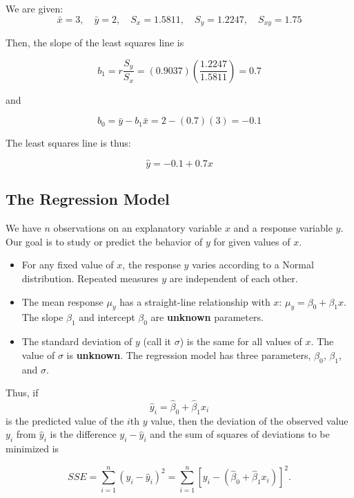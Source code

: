 \begin{example}
\vspace{1em}

We are given:
\[
\bar{x} = 3, \quad \bar{y} = 2, \quad S_x = 1.5811, \quad S_y = 1.2247, \quad S_{xy} = 1.75
\]

Then, the slope of the least squares line is

\[
b_1 = r \frac{S_y}{S_x} = (0.9037) \left( \frac{1.2247}{1.5811} \right) = 0.7
\]

and

\[
b_0 = \bar{y} - b_1 \bar{x} = 2 - (0.7)(3) = -0.1
\]

The least squares line is thus:

\[
\hat{y} = -0.1 + 0.7x
\]
\end{example}

\subsection*{The Regression Model}

We have $n$ observations on an explanatory variable $x$ and a response variable $y$. Our goal is to study or predict the behavior of $y$ for given values of $x$.

\begin{itemize}
  \item For any fixed value of $x$, the response $y$ varies according to a Normal distribution. Repeated measures $y$ are independent of each other.
  
  \item The mean response $\mu_y$ has a straight-line relationship with $x$:  
  $\mu_y = \beta_0 + \beta_1 x$.  
  The slope $\beta_1$ and intercept $\beta_0$ are \textbf{unknown} parameters.
  
  \item The standard deviation of $y$ (call it $\sigma$) is the same for all values of $x$.  
  The value of $\sigma$ is \textbf{unknown}.  
  The regression model has three parameters, $\beta_0$, $\beta_1$, and $\sigma$.
\end{itemize}

Thus, if
\[
\hat{y}_i = \hat{\beta}_0 + \hat{\beta}_1 x_i
\]
is the predicted value of the $i$th $y$ value, then the deviation of the observed value $y_i$ from $\hat{y}_i$ is the difference $y_i - \hat{y}_i$ and the sum of squares of deviations to be minimized is

\[
SSE = \sum_{i=1}^{n} (y_i - \hat{y}_i)^2 = \sum_{i=1}^{n} [y_i - (\hat{\beta}_0 + \hat{\beta}_1 x_i)]^2.
\]


